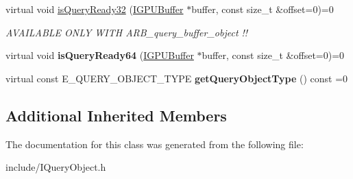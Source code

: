 \begin{DoxyCompactItemize}
\item 
virtual void \hyperlink{classirr_1_1video_1_1IQueryObject_aaa61fd1b6540fdd5ba0270412bf05326}{is\+Query\+Ready32} (\hyperlink{classirr_1_1video_1_1IGPUBuffer}{I\+G\+P\+U\+Buffer} $\ast$buffer, const size\+\_\+t \&offset=0)=0\hypertarget{classirr_1_1video_1_1IQueryObject_aaa61fd1b6540fdd5ba0270412bf05326}{}\label{classirr_1_1video_1_1IQueryObject_aaa61fd1b6540fdd5ba0270412bf05326}

\begin{DoxyCompactList}\small\item\em A\+V\+A\+I\+L\+A\+B\+LE O\+N\+LY W\+I\+TH A\+R\+B\+\_\+query\+\_\+buffer\+\_\+object !! \end{DoxyCompactList}\item 
virtual void {\bfseries is\+Query\+Ready64} (\hyperlink{classirr_1_1video_1_1IGPUBuffer}{I\+G\+P\+U\+Buffer} $\ast$buffer, const size\+\_\+t \&offset=0)=0\hypertarget{classirr_1_1video_1_1IQueryObject_a292a09602a6125458fd11fdde5cbc4d2}{}\label{classirr_1_1video_1_1IQueryObject_a292a09602a6125458fd11fdde5cbc4d2}

\item 
virtual const E\+\_\+\+Q\+U\+E\+R\+Y\+\_\+\+O\+B\+J\+E\+C\+T\+\_\+\+T\+Y\+PE {\bfseries get\+Query\+Object\+Type} () const  =0\hypertarget{classirr_1_1video_1_1IQueryObject_aff7e93fee7b1fcd2c02619706c807ffd}{}\label{classirr_1_1video_1_1IQueryObject_aff7e93fee7b1fcd2c02619706c807ffd}

\end{DoxyCompactItemize}
\subsection*{Additional Inherited Members}


The documentation for this class was generated from the following file\+:\begin{DoxyCompactItemize}
\item 
include/I\+Query\+Object.\+h\end{DoxyCompactItemize}
